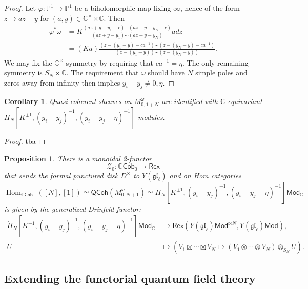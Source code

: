 \documentclass[11pt]{report}
\newtheorem{prop}[theorem]{Proposition}
\newtheorem{corollary}[theorem]{Corollary}
\theoremstyle{definition}
\theoremstyle{remark}
\theoremstyle{remark}
\newcommand{\Hom}{\operatorname{Hom}}
\newcommand{\C}{\mathbb{C}}
\renewcommand{\P}{\mathbb{P}}
\begin{document}
\begin{proof}
Let $\varphi: \P^1 \to \P^1$ be a biholomorphic map fixing $\infty$, hence of the form $z \mapsto az+y$ for $(a,y) \in \C^\times \ltimes \C$. Then
\begin{align*}
\varphi^* \omega
&= K \frac{(az+y-y_1-c) \cdots (az+y-y_N-c)}{(az+y-y_1) \cdots (az+y-y_N)} a dz \\
&= (Ka) \frac{(z-(y_1-y)-ca^{-1}) \cdots (z-(y_N-y)-ca^{-1})}{(z-(y_1-y)) \cdots (z-(y_N-y))}.
\end{align*}
We may fix the $\C^\times$-symmetry by requiring that $ca^{-1} = \eta$. The only remaining symmetry is $S_N \times \C$. The requirement that $\omega$ should have $N$ simple poles and zeros away from infinity then implies $y_i-y_j \neq 0,\eta$.
\end{proof}

\begin{corollary}
Quasi-coherent sheaves on $M_{0,1+N}^\omega$ are identified with $\C$-equivariant $\dot H_N[K^{\pm 1},(y_i-y_j)^{-1},(y_i-y_j-\eta)^{-1}]$-modules.
\end{corollary}

\begin{proof}
tba
\end{proof}

\begin{prop}
There is a monoidal 2-functor
\begin{equation*}
\mathcal{Z}_0: \C\mathsf{Cob}_0 \to \mathsf{Rex}
\end{equation*}
that sends the formal punctured disk $D^\times$ to $Y(\mathfrak{gl}_\ell)$ and on Hom categories
\begin{equation*}
\Hom_{\C\mathsf{Cob}_0}([N],[1]) \simeq \mathsf{QCoh}(M_{0,N+1}^\omega) \simeq \dot H_N[K^{\pm 1},(y_i-y_j)^{-1},(y_i-y_j-\eta)^{-1}]\mathsf{Mod}_\C
\end{equation*}
is given by the generalized Drinfeld functor:
\begin{align*}
\dot H_N[K^{\pm 1},(y_i-y_j)^{-1},(y_i-y_j-\eta)^{-1}]\mathsf{Mod}_\C &\to \mathsf{Rex}(Y(\mathfrak{gl}_\ell)\mathsf{Mod}^{\boxtimes N},Y(\mathfrak{gl}_\ell)\mathsf{Mod}), \\
U &\mapsto (V_1 \boxtimes \cdots \boxtimes V_N \mapsto (V_1 \otimes \cdots \otimes V_N) \otimes_{S_N} U).
\end{align*}
\end{prop}

\subsection{Extending the functorial quantum field theory}
\end{document}
